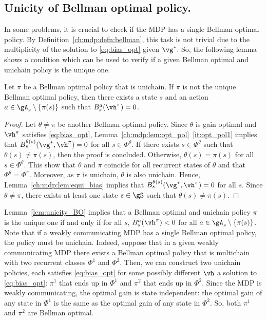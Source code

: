 \subsection{Unicity of Bellman optimal policy.}
\label{ssec:unicity}

In some problems, it is crucial to check if the MDP has a single Bellman optimal policy.
By Definition~\ref{ch:mdp:defn:bellman}, this task is not trivial due to the multiplicity of the solution to \eqref{eq:bias_opt} given $\vg^*$.
So, the following lemma shows a condition which can be used to verify if a given Bellman optimal and unichain policy is the unique one.

\begin{lem}
    \label{ch:mdp:lem:unicity_BO}
    Let $\pi$ be a Bellman optimal policy that is unichain. If $\pi$ is not the unique Bellman optimal policy, then there exists a state $s$ and an action $a\in\gA_s\setminus\{\pi(s)\}$ such that $B_s^a(\vh^\pi)=0$.
\end{lem}

\begin{proof}
    Let $\theta\neq\pi$ be another Bellman optimal policy. Since $\theta$ is gain optimal and $\vh^\pi$ satisfies \eqref{eq:bias_opt}, Lemma~\ref{ch:mdp:lem:opt_pol}~\ref{it:opt_pol1} implies that $B_s^{\theta(s)}(\vg^*,\vh^\pi) =0$ for all $s\in\Phi^\theta$. If there exists $s\in\Phi^\theta$ such that $\theta(s)\neq\pi(s)$, then the proof is concluded.  Otherwise, $\theta(s)=\pi(s)$ for all $s\in\Phi^\theta$.
    This show that $\theta$ and $\pi$ coincide for all recurrent states of $\theta$ and that $\Phi^\theta=\Phi^\pi$. Moreover, as $\pi$ is unichain, $\theta$ is also unichain. Hence, Lemma~\ref{ch:mdp:lem:equi_bias} implies that $B_s^{\theta(s)}(\vg^*, \vh^\pi)=0$ for all $s$. Since $\theta\neq\pi$, there exists at least one state $s\in\gS$ such that $\theta(s)\neq\pi(s)$.
\end{proof}
Lemma~\ref{lem:unicity_BO} implies that a Bellman optimal and unichain policy $\pi$ is the unique one if and only if for all $s$, $B_s^a(\vh^\pi)<0$ for all $a\in\gA_s\setminus\{\pi(s)\}$.
Note that if a weakly communicating MDP has a single Bellman optimal policy, the policy must be unichain.
Indeed, suppose that in a given weakly communicating MDP there exists a Bellman optimal policy that is multichain with two recurrent classes $\Phi^1$ and $\Phi^2$.
Then, we can construct two unichain policies, each satisfies \eqref{eq:bias_opt} for some possibly different $\vh$ a solution to \eqref{eq:bias_opt}: $\pi^1$ that ends up in $\Phi^1$ and $\pi^2$ that ends up in $\Phi^2$.
Since the MDP is weakly communicating, the optimal gain is state independent: the optimal gain of any state in $\Phi^1$ is the same as the optimal gain of any state in $\Phi^2$.
So, both $\pi^1$ and $\pi^2$ are Bellman optimal.

